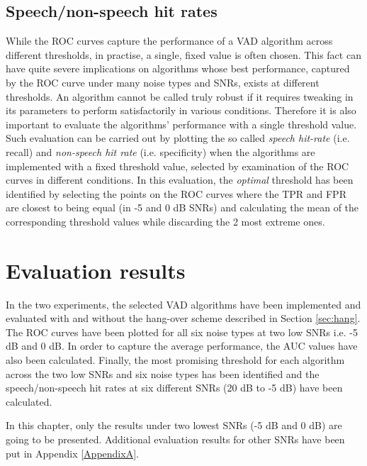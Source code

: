 \subsection{Speech/non-speech hit rates}

While the ROC curves capture the performance of a VAD algorithm across different thresholds, in practise, a single, fixed value is often chosen. This fact can have quite severe implications on algorithms whose best performance, captured by the ROC curve under many noise types and SNRs, exists at different thresholds. An algorithm cannot be called truly robust if it requires tweaking in its parameters to perform satisfactorily in various conditions. Therefore it is also important to evaluate the algorithms' performance with a single threshold value. Such evaluation can be carried out by plotting the so called \emph{speech hit-rate} (i.e. recall) and \emph{non-speech hit rate} (i.e. specificity) when the algorithms are implemented with a fixed threshold value, selected by examination of the ROC curves in different conditions. In this evaluation, the \emph{optimal} threshold has been identified by selecting the points on the ROC curves where the TPR and FPR are closest to being equal (in -5 and 0 dB SNRs) and calculating the mean of the corresponding threshold values while discarding the 2 most extreme ones.


\section{Evaluation results}

In the two experiments, the selected VAD algorithms have been implemented and evaluated with and without the hang-over scheme described in Section \ref{sec:hang}. The ROC curves have been plotted for all six noise types at two low SNRs i.e. -5 dB and 0 dB. In order to capture the average performance, the AUC values have also been calculated. Finally, the most promising threshold for each algorithm across the two low SNRs and six noise types has been identified and the speech/non-speech hit rates at six different SNRs (20 dB to -5 dB) have been calculated.

In this chapter, only the results under two lowest SNRs (-5 dB and 0 dB) are going to be presented. Additional evaluation results for other SNRs have been put in Appendix \ref{AppendixA}.

